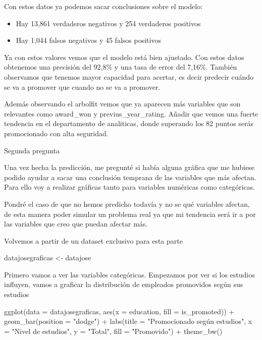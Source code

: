 \documentclass[
]{article}
\newenvironment{Shaded}{\begin{snugshade}}{\end{snugshade}}
\newcommand{\AttributeTok}[1]{\textcolor[rgb]{0.77,0.63,0.00}{#1}}
\newcommand{\FunctionTok}[1]{\textcolor[rgb]{0.00,0.00,0.00}{#1}}
\newcommand{\NormalTok}[1]{#1}
\newcommand{\OtherTok}[1]{\textcolor[rgb]{0.56,0.35,0.01}{#1}}
\newcommand{\SpecialCharTok}[1]{\textcolor[rgb]{0.00,0.00,0.00}{#1}}
\newcommand{\StringTok}[1]{\textcolor[rgb]{0.31,0.60,0.02}{#1}}
\begin{document}
Con estos datos ya podemos sacar conclusiones sobre el modelo:

\begin{itemize}
\item
  Hay 13,861 verdaderos negativos y 254 verdaderos positivos
\item
  Hay 1,044 falsos negativos y 45 falsos positivos
\end{itemize}

Ya con estos valores vemos que el modelo está bien ajustado. Con estos
datos obtenemos una precisión del 92,8\% y una tasa de error del 7,16\%.
También observamos que tenemos mayor capacidad para acertar, es decir
predecir cuándo se va a promover que cuando no se va a promover.

Además observando el arbolfit vemos que ya aparecen más variables que
son relevantes como award\_won y previus\_year\_rating. Añadir que vemos
una fuerte tendencia en el departamento de analiticas, donde superando
los 82 puntos serás promocionado con alta seguridad.

Segunda pregunta

Una vez hecha la predicción, me pregunté si había alguna gráfica que me
hubiese podido ayudar a sacar una conclusión temprana de las variables
que más afectan. Para ello voy a realizar gráficas tanto para variables
numéricas como categóricas.

Pondré el caso de que no hemos predicho todavía y no se qué variables
afectan, de esta manera poder simular un problema real ya que mi
tendencia será ir a por las variables que creo que puedan afectar más.

Volvemos a partir de un dataset exclusivo para esta parte

\begin{Shaded}
\begin{Highlighting}[]
\NormalTok{datajosegraficas }\OtherTok{\textless{}{-}}\NormalTok{ datajose}
\end{Highlighting}
\end{Shaded}

Primero vamos a ver las variables categóricas. Empezamos por ver si los
estudios influyen, vamos a graficar la distribución de empleados
promovidos según sus estudios

\begin{Shaded}
\begin{Highlighting}[]
\FunctionTok{ggplot}\NormalTok{(}\AttributeTok{data =}\NormalTok{ datajosegraficas, }\FunctionTok{aes}\NormalTok{(}\AttributeTok{x =}\NormalTok{ education, }\AttributeTok{fill =}\NormalTok{ is\_promoted)) }\SpecialCharTok{+}
  \FunctionTok{geom\_bar}\NormalTok{(}\AttributeTok{position =} \StringTok{"dodge"}\NormalTok{) }\SpecialCharTok{+}
  \FunctionTok{labs}\NormalTok{(}\AttributeTok{title =} \StringTok{"Promocionado según estudios"}\NormalTok{, }
       \AttributeTok{x =} \StringTok{"Nivel de estudios"}\NormalTok{, }
       \AttributeTok{y =} \StringTok{"Total"}\NormalTok{,}
       \AttributeTok{fill =} \StringTok{"Promovido"}\NormalTok{) }\SpecialCharTok{+}
  \FunctionTok{theme\_bw}\NormalTok{()}
\end{Highlighting}
\end{Shaded}
\end{document}
